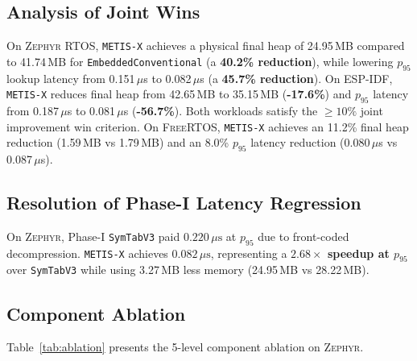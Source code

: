 \documentclass[conference]{IEEEtran}
\begin{document}
\subsection{Analysis of Joint Wins}
On \textsc{Zephyr} RTOS, \texttt{METIS-X} achieves a physical final heap of 24.95\,MB compared to 41.74\,MB for \texttt{EmbeddedConventional} (a \textbf{40.2\% reduction}), while lowering $p_{95}$ lookup latency from 0.151\,$\mu$s to 0.082\,$\mu$s (a \textbf{45.7\% reduction}). On \textsc{ESP-IDF}, \texttt{METIS-X} reduces final heap from 42.65\,MB to 35.15\,MB (\textbf{-17.6\%}) and $p_{95}$ latency from 0.187\,$\mu$s to 0.081\,$\mu$s (\textbf{-56.7\%}). Both workloads satisfy the $\ge 10\%$ joint improvement win criterion. On \textsc{FreeRTOS}, \texttt{METIS-X} achieves an 11.2\% final heap reduction (1.59\,MB vs 1.79\,MB) and an 8.0\% $p_{95}$ latency reduction (0.080\,$\mu$s vs 0.087\,$\mu$s).

\subsection{Resolution of Phase-I Latency Regression}
On \textsc{Zephyr}, Phase-I \texttt{SymTabV3} paid $0.220\,\mu\text{s}$ at $p_{95}$ due to front-coded decompression. \texttt{METIS-X} achieves $0.082\,\mu\text{s}$, representing a \textbf{$2.68\times$ speedup at $p_{95}$} over \texttt{SymTabV3} while using 3.27\,MB less memory (24.95\,MB vs 28.22\,MB).

\subsection{Component Ablation}
Table~\ref{tab:ablation} presents the 5-level component ablation on \textsc{Zephyr}.

\begin{table}[h]
\centering
\caption{Component Ablation Waterfall on \textsc{Zephyr} RTOS}
\label{tab:ablation}
\end{table}
\end{document}
